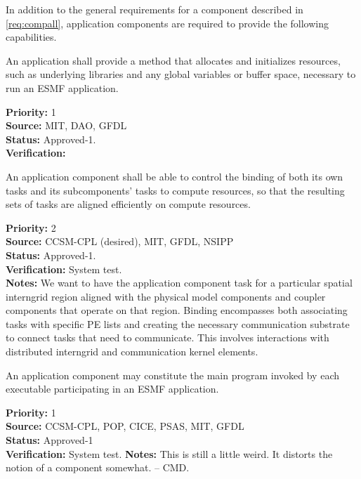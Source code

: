
In addition to the general requirements for a component described in 
\ref{req:compall}, application components are required to provide the
following capabilities.

An application shall provide a method that allocates and initializes 
resources, such as underlying libraries and any global variables or 
buffer space, necessary to run an ESMF application.
\begin{reqlist}
{\bf Priority:} 1 \\
{\bf Source:} MIT, DAO, GFDL \\
{\bf Status:} Approved-1.\\
{\bf Verification:}  
\end{reqlist}


An application component shall be able to control the binding of both its own
tasks and its subcomponents' tasks to compute resources, so that the resulting
sets of tasks are aligned efficiently on compute resources.

\begin{reqlist}
{\bf Priority:} 2 \\
{\bf Source:}  CCSM-CPL (desired), MIT, GFDL, NSIPP \\
{\bf Status:} Approved-1. \\
{\bf Verification:} System test.\\
{\bf Notes:}  We want to have the application component task for a particular
  spatial interngrid region aligned with the physical model components and
  coupler components that operate on that region.  Binding
  encompasses both associating tasks with specific PE lists and
  creating the necessary communication substrate to connect tasks that
  need to communicate.  This involves interactions with distributed
  interngrid and communication kernel elements.
\end{reqlist}

An application component may constitute the main program invoked by each
executable participating in an ESMF application.
\begin{reqlist}
{\bf Priority:} 1\\
{\bf Source:} CCSM-CPL, POP, CICE, PSAS, MIT, GFDL \\
{\bf Status:} Approved-1 \\
{\bf Verification:} System test.
{\bf Notes:}  This is still a little weird.  It distorts the notion of a
component somewhat.  -- CMD.
\end{reqlist}

